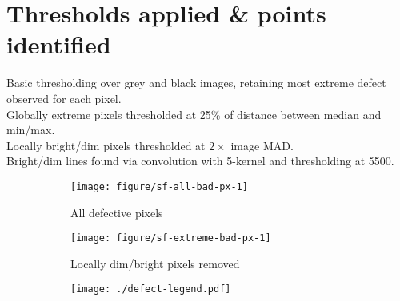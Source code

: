 \documentclass[10pt,fleqn]{article}\usepackage[]{graphicx}\usepackage[]{color}
\newenvironment{knitrout}{}{} %
\begin{document}
\renewenvironment{knitrout}{\vspace{1em}}{\vspace{1em}}


\section{Thresholds applied \& points identified}

\begin{footnotesize}
Basic thresholding over grey and black images, retaining most extreme defect observed for each pixel.\\
Globally extreme pixels thresholded at 25\% of distance between median and min/max. \\
Locally bright/dim pixels thresholded at $2\times$ image MAD.\\
Bright/dim lines found via convolution with 5-kernel and thresholding at 5500.
\end{footnotesize}

\begin{figure}[!ht]
\caption{Bad pixels identified}
\centering

\begin{subfigure}[c]{0.45\textwidth}
\caption{All defective pixels}
\begin{knitrout}\footnotesize
{}\color{fgcolor}

{\centering \texttt{[image: figure/sf-all-bad-px-1]} 

}



\end{knitrout}
\end{subfigure}
%
\begin{subfigure}[c]{0.45\textwidth}
\caption{Locally dim/bright pixels removed}
\begin{knitrout}\footnotesize
{}\color{fgcolor}

{\centering \texttt{[image: figure/sf-extreme-bad-px-1]} 

}



\end{knitrout}
\end{subfigure}
%
\begin{subfigure}[c]{0.08\textwidth}
\texttt{[image: ./defect-legend.pdf]}
\end{subfigure}
\end{figure}
\end{document}
